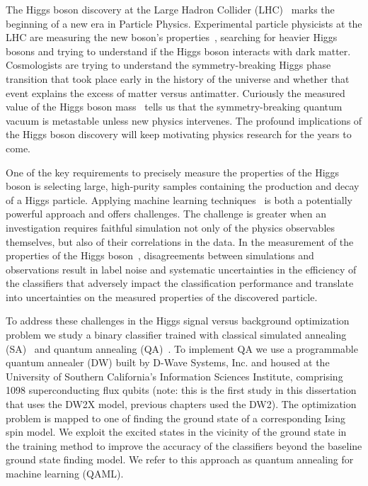 The Higgs boson discovery at the Large Hadron Collider (LHC)~\cite{Chatrchyan:2012xdj,Aad:2012tfa}
marks the beginning of a new era in Particle Physics.  Experimental particle physicists at the LHC are measuring the new boson's properties~\cite{Khachatryan:2014ira,Aad:2014eha}, searching for heavier Higgs
bosons\cite{Olive:2016xmw} and trying to understand if the Higgs boson interacts with dark
matter\cite{Englert:2011yb}. Cosmologists are trying to understand
the symmetry-breaking Higgs phase transition that took place early in the history of the universe and
whether that event explains the excess of matter versus antimatter\cite{Morrissey:2012db}.
Curiously the measured value of the Higgs boson mass~\cite{Olive:2016xmw} tells us that  the symmetry-breaking
quantum vacuum is metastable\cite{Buttazzo:2013uya} unless new physics intervenes.
The profound implications of the Higgs boson discovery will keep motivating physics research for the years to come.

One of the key requirements to precisely measure the properties of the Higgs boson is selecting
large, high-purity samples containing the production and decay of a Higgs particle.  Applying machine learning techniques~\cite{1742-6596-664-7-072015} is both a potentially powerful approach and offers challenges. The challenge is greater when an investigation requires faithful simulation
not only of the physics observables themselves, but also of their correlations in the data.   In the measurement of the properties of the Higgs boson~\cite{Khachatryan:2014ira}, disagreements between simulations and observations result in label noise and systematic uncertainties in the efficiency of the classifiers that adversely impact the classification performance and  translate into uncertainties on the measured properties of the discovered particle.

To address these challenges in the Higgs signal versus background optimization problem we study a binary classifier trained with classical simulated annealing (SA)~\cite{kirkpatrick_optimization_1983,katzgraber:06a} and quantum annealing (QA)~\cite{kadowaki_quantum_1998,RevModPhys.80.1061,Neven1,Pudenz:2013kx,q-sig2}. To implement QA we use a programmable quantum annealer (DW) built by D-Wave Systems, Inc. and housed at the University of Southern California's Information Sciences Institute, comprising 1098 superconducting flux qubits (note: this is the first study in this dissertation that uses the DW2X model, previous chapters used the DW2). The optimization problem is mapped to one of finding the ground state of a corresponding Ising spin model. We exploit the excited states in the vicinity of the ground state in the training method to improve the accuracy of the classifiers beyond the baseline ground state finding model. We refer to this  approach as quantum annealing for machine learning (QAML).

